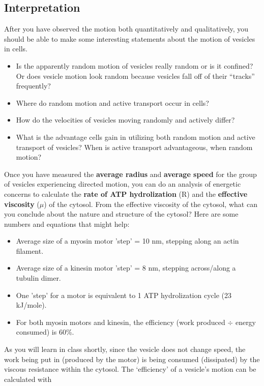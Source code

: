 \subsection*{Interpretation}
After you have observed the motion both quantitatively and qualitatively, you should be able to make some interesting statements about the motion of vesicles in cells.
\begin{itemize}
\item Is the apparently random motion of vesicles really random or is it confined? Or does vesicle motion look random because vesicles fall off of their ``tracks'' frequently?
\item Where do random motion and active transport occur in cells?
\item How do the velocities of vesicles moving randomly and actively differ?
\item What is the advantage cells gain in utilizing both random motion and active transport of vesicles? When is active transport advantageous, when random motion?
\end{itemize}
Once you have measured the \textbf{average radius} and \textbf{average speed} for the group of vesicles experiencing directed motion, you can do an analysis of energetic concerns to calculate the \textbf{rate of ATP hydrolization} (R) and the \textbf{effective viscosity} ($\mu$) of the cytosol. From the effective viscosity of the cytosol, what can you conclude about the nature and structure of the cytosol? Here are some numbers and equations that might help:
\begin{itemize}
\item Average size of a myosin motor 'step' = 10 nm, stepping along an actin filament.
\item Average size of a kinesin motor 'step' = 8 nm, stepping across/along a tubulin dimer.
\item One 'step' for a motor is equivalent to 1 ATP hydrolization cycle (23 kJ/mole).
\item For both myosin motors and kinesin, the efficiency (work produced $\div$ energy consumed) is 60\%.
\end{itemize}
As you will learn in class shortly, since the vesicle does not change speed, the work being put in (produced by the motor) is being consumed (dissipated) by the viscous resistance within the cytosol.
The `efficiency' of a vesicle's motion can be calculated with
